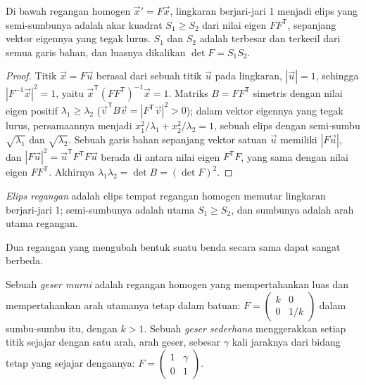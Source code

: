 \begin{proposition}\label{prop:b1:stress-strain-rheology:ellipse}
Di bawah regangan homogen $\vec x' = F\vec x$, lingkaran berjari-jari 1 menjadi elips yang semi-sumbunya adalah akar kuadrat $S_1 \ge S_2$ dari nilai eigen $FF^{\mathsf T}$, sepanjang vektor eigennya yang tegak lurus. $S_1$ dan $S_2$ adalah  terbesar dan terkecil dari semua garis bahan, dan luasnya dikalikan $\det F = S_1S_2$.
\end{proposition}

\begin{proof}
Titik $\vec x = F\vec u$ berasal dari sebuah titik $\vec u$ pada lingkaran, $|\vec u| = 1$, sehingga $|F^{-1}\vec x|^2 = 1$, yaitu $\vec x^{\mathsf T}(FF^{\mathsf T})^{-1}\vec x = 1$. Matriks $B = FF^{\mathsf T}$ simetris dengan nilai eigen positif $\lambda_1 \ge
\lambda_2$ ($\vec v^{\mathsf T}B\vec v = |F^{\mathsf T}\vec v|^2 > 0$); dalam vektor eigennya yang tegak lurus, persamaannya menjadi
$x_1^2/\lambda_1 + x_2^2/\lambda_2 = 1$, sebuah elips dengan semi-sumbu $\sqrt{\lambda_1}$ dan $\sqrt{\lambda_2}$. Sebuah garis bahan sepanjang vektor satuan $\vec u$ memiliki  $|F\vec u|$, dan
$|F\vec u|^2 = \vec u^{\mathsf T}F^{\mathsf T}F\vec u$ berada di antara nilai eigen $F^{\mathsf T}F$, yang sama dengan nilai eigen $FF^{\mathsf T}$. Akhirnya
$\lambda_1\lambda_2 = \det B = (\det F)^2$.
\end{proof}

\begin{definition}\label{def:b1:stress-strain-rheology:strain-ellipse}
\emph{Elips regangan} adalah elips tempat regangan homogen memutar lingkaran berjari-jari 1; semi-sumbunya adalah  utama $S_1 \ge S_2$, dan sumbunya adalah arah utama regangan.
\end{definition}

Dua regangan yang mengubah bentuk suatu benda secara sama dapat sangat berbeda.

\begin{definition}\label{def:b1:stress-strain-rheology:shear-types}
Sebuah \emph{geser murni} adalah regangan homogen yang mempertahankan luas dan
mempertahankan arah utamanya tetap dalam batuan:
$F = \begin{pmatrix} k & 0 \\ 0 & 1/k\end{pmatrix}$ dalam sumbu-sumbu itu, dengan
$k > 1$. Sebuah \emph{geser sederhana} menggerakkan setiap titik sejajar dengan
satu arah, arah geser, sebesar $\gamma$ kali jaraknya dari bidang tetap yang sejajar dengannya:
$F = \begin{pmatrix} 1 & \gamma \\ 0 & 1\end{pmatrix}$.
\end{definition}

